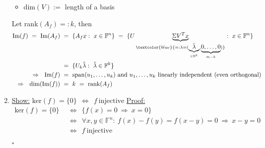 \begin{enumerate}
\begin{itemize}
		\item dim$(V) :=$ length of a basis
	\end{itemize}
	Let rank$(A_f)=:k$, then
	\begin{align*}
	\text{Im}(f)~=~\text{Im}(A_f)~&=~\{A_fx:~x\in\mathbb{F}^n\}~=~\{U\underbrace{\Sigma V^T x}_{\textcolor{blue}{=:\lambda=(\underbrace{\tilde{\lambda}}_{\in\mathbb{R}^k},\underbrace{0,\dots,0}_{m-k})}}:~x\in\mathbb{F}^n\}\\
	&=~\{U_k\tilde{\lambda}:~\tilde{\lambda}\in\mathbb{F}^k\}\\
	\Rightarrow~~\text{Im}(f)~&=~\text{span}(u_1,\dots,u_k)~\text{and}~u_1,\dots,u_k~\text{linearly independent (even orthogonal)}\\
	\Rightarrow~~\text{dim}(\text{Im}(f))~&=~k~=~\text{rank}(A_f)
	\end{align*}
%	
	\item 
	\underline{Show:} $\text{ker}(f)=\{0\}~~\Leftrightarrow~~f~\text{injective}$
	\underline{Proof:}
	\begin{align*}
	\text{ker}(f)=\{0\}~~&\Leftrightarrow~~\{f(x)=0~\Rightarrow~x=0\}\\
	&\Leftrightarrow~~\forall x,y\in\mathbb{F}^n:~f(x)-f(y)=f(x-y)=0~\Rightarrow~x-y=0\\
	&\Leftrightarrow~~f~\text{injective}
	\end{align*}
	\begin{flushright}$\square$\end{flushright}
\end{enumerate}